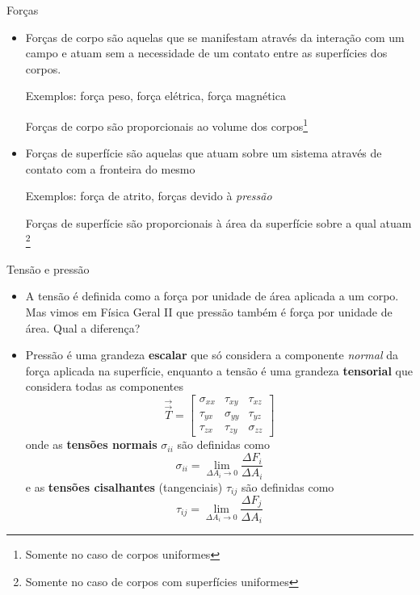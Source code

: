 \documentclass[t,%
brazilian,%
11pt,%
aspectratio=169,%
table%
]{beamer}
\begin{document}
\begin{frame}{Forças}
    \begin{itemize}
        \item Forças de corpo são aquelas que se manifestam através da interação com um campo e 
            atuam sem a necessidade de um contato entre as superfícies dos corpos.

            Exemplos: força peso, força elétrica, força magnética

            Forças de corpo são proporcionais ao volume dos corpos\footnote{Somente no caso de corpos uniformes}

        \item Forças de superfície são aquelas que atuam sobre um sistema através de contato com a fronteira do mesmo

            Exemplos: força de atrito, forças devido à \textit{pressão}

            Forças de superfície são proporcionais à área da superfície sobre a qual atuam
            \footnote{Somente no caso de corpos com superfícies uniformes}
    \end{itemize}
\end{frame}

\begin{frame}{Tensão e pressão}
    \begin{itemize}
        \item  A tensão é definida como a força por unidade de área aplicada a
            um corpo. Mas vimos em Física Geral II que pressão também é força
            por unidade de área. Qual a diferença?
        \item Pressão é uma grandeza \textbf{escalar} que só considera a componente \textit{normal} da força aplicada na superfície,
            enquanto a tensão é uma grandeza \textbf{tensorial} que considera todas as componentes
            \[
                \vec{\vec{T}}=
                \begin{bmatrix}
                    \sigma_{xx} & \tau_{xy} & \tau_{xz} \\ 
                    \tau_{yx} & \sigma_{yy} & \tau_{yz} \\
                    \tau_{zx} & \tau_{zy} & \sigma_{zz}
                \end{bmatrix}
            \]
            onde as \textbf{tensões normais} \(\sigma_{ii}\) são definidas como
            \[
                \sigma_{ii} = \lim_{\Delta A_i \to 0} \frac{\Delta F_i}{\Delta A_i}
            \]
            e as \textbf{tensões cisalhantes} (tangenciais) \(\tau_{ij}\) são definidas como
            \[
                \tau_{ij} = \lim_{\Delta A_i \to 0} \frac{\Delta F_j}{\Delta A_i}
            \]
    \end{itemize}
\end{frame}
\end{document}
